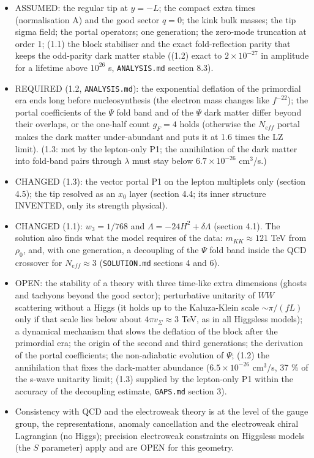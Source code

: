 \documentclass[11pt]{article}
\begin{document}
\begin{itemize}
\item ASSUMED: the regular tip at $y = -L$; the compact extra times (normalisation A) and the good sector $q = 0$; the kink bulk masses; the tip sigma field; the portal operators; one generation; the zero-mode truncation at order 1; (1.1) the block stabiliser and the exact fold-reflection parity that keeps the odd-parity dark matter stable ((1.2) exact to $2\times10^{-27}$ in amplitude for a lifetime above $10^{26}$ s, \texttt{ANALYSIS.\allowbreak{}md} section 8.3).
\item REQUIRED (1.2, \texttt{ANALYSIS.\allowbreak{}md}): the exponential deflation of the primordial era ends long before nucleosynthesis (the electron mass changes like $f^{-22}$); the portal coefficients of the $\Psi$ fold band and of the $\Psi$ dark matter differ beyond their overlaps, or the one-half count $g_F = 4$ holds (otherwise the $N_{eff}$ portal makes the dark matter under-abundant and puts it at 1.6 times the LZ limit). (1.3: met by the lepton-only P1; the annihilation of the dark matter into fold-band pairs through $\lambda$ must stay below $6.7\times10^{-26}$ cm$^3$/s.)
\item CHANGED (1.3): the vector portal P1 on the lepton multiplets only (section 4.5); the tip resolved as an $x_0$ layer (section 4.4; its inner structure INVENTED, only its strength physical).
\item CHANGED (1.1): $w_3 = 1/768$ and $\Lambda = -24H^2 + \delta\Lambda$ (section 4.1). The solution also finds what the model requires of the data: $m_{KK} \approx 121$ TeV from $\rho_0$, and, with one generation, a decoupling of the $\Psi$ fold band inside the QCD crossover for $N_{eff} \approx 3$ (\texttt{SOLUTION.\allowbreak{}md} sections 4 and 6).
\item OPEN: the stability of a theory with three time-like extra dimensions (ghosts and tachyons beyond the good sector); perturbative unitarity of $WW$ scattering without a Higgs (it holds up to the Kaluza-Klein scale $\sim \pi/(fL)$ only if that scale lies below about $4\pi v_\Sigma \approx 3$ TeV, as in all Higgsless models); a dynamical mechanism that slows the deflation of the block after the primordial era; the origin of the second and third generations; the derivation of the portal coefficients; the non-adiabatic evolution of $\Psi$; (1.2) the annihilation that fixes the dark-matter abundance ($6.5\times10^{-26}$ cm$^3$/s, 37 \% of the s-wave unitarity limit; (1.3) supplied by the lepton-only P1 within the accuracy of the decoupling estimate, \texttt{GAPS.\allowbreak{}md} section 3).
\item Consistency with QCD and the electroweak theory is at the level of the gauge group, the representations, anomaly cancellation and the electroweak chiral Lagrangian (no Higgs); precision electroweak constraints on Higgsless models (the $S$ parameter) apply and are OPEN for this geometry.
\end{itemize}
\end{document}
